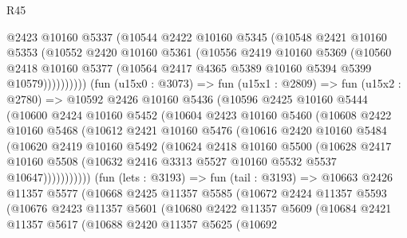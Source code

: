 \begin{lexlean}{R45}
\begin{coremodule}
                @2423
                @10160
                @5337
                (@10544
                  @2422
                  @10160
                  @5345
                  (@10548
                    @2421
                    @10160
                    @5353
                    (@10552
                      @2420
                      @10160
                      @5361
                      (@10556
                        @2419
                        @10160
                        @5369
                        (@10560
                          @2418
                          @10160
                          @5377
                          (@10564 @2417 @4365 @5389 @10160 @5394 @5399 @10579))))))))))
        (fun (u15x0 : @3073) =>
        fun (u15x1 : @2809) =>
        fun (u15x2 : @2780) =>
        @10592
          @2426
          @10160
          @5436
          (@10596
            @2425
            @10160
            @5444
            (@10600
              @2424
              @10160
              @5452
              (@10604
                @2423
                @10160
                @5460
                (@10608
                  @2422
                  @10160
                  @5468
                  (@10612
                    @2421
                    @10160
                    @5476
                    (@10616
                      @2420
                      @10160
                      @5484
                      (@10620
                        @2419
                        @10160
                        @5492
                        (@10624
                          @2418
                          @10160
                          @5500
                          (@10628
                            @2417
                            @10160
                            @5508
                            (@10632 @2416 @3313 @5527 @10160 @5532 @5537 @10647)))))))))))
        (fun (lets : @3193) =>
        fun (tail : @3193) =>
        @10663
          @2426
          @11357
          @5577
          (@10668
            @2425
            @11357
            @5585
            (@10672
              @2424
              @11357
              @5593
              (@10676
                @2423
                @11357
                @5601
                (@10680
                  @2422
                  @11357
                  @5609
                  (@10684
                    @2421
                    @11357
                    @5617
                    (@10688
                      @2420
                      @11357
                      @5625
                      (@10692

\end{coremodule}
\end{lexlean}
